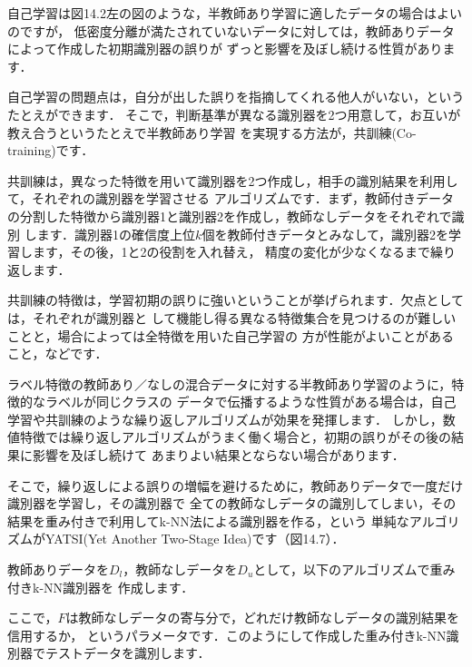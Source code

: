 
自己学習は図14.2左の図のような，半教師あり学習に適したデータの場合はよいのですが，
低密度分離が満たされていないデータに対しては，教師ありデータによって作成した初期識別器の誤りが
ずっと影響を及ぼし続ける性質があります．



自己学習の問題点は，自分が出した誤りを指摘してくれる他人がいない，というたとえができます．
そこで，判断基準が異なる識別器を2つ用意して，お互いが教え合うというたとえで半教師あり学習
を実現する方法が，共訓練(Co-training)です．


共訓練は，異なった特徴を用いて識別器を2つ作成し，相手の識別結果を利用して，それぞれの識別器を学習させる
アルゴリズムです．まず，教師付きデータの分割した特徴から識別器1と識別器2を作成し，教師なしデータをそれぞれで識別
します．識別器1の確信度上位$k$個を教師付きデータとみなして，識別器2を学習します，その後，1と2の役割を入れ替え，
精度の変化が少なくなるまで繰り返します．


共訓練の特徴は，学習初期の誤りに強いということが挙げられます．欠点としては，それぞれが識別器と
して機能し得る異なる特徴集合を見つけるのが難しいことと，場合によっては全特徴を用いた自己学習の
方が性能がよいことがあること，などです．


ラベル特徴の教師あり／なしの混合データに対する半教師あり学習のように，特徴的なラベルが同じクラスの
データで伝播するような性質がある場合は，自己学習や共訓練のような繰り返しアルゴリズムが効果を発揮します．
しかし，数値特徴では繰り返しアルゴリズムがうまく働く場合と，初期の誤りがその後の結果に影響を及ぼし続けて
あまりよい結果とならない場合があります．

そこで，繰り返しによる誤りの増幅を避けるために，教師ありデータで一度だけ識別器を学習し，その識別器で
全ての教師なしデータの識別してしまい，その結果を重み付きで利用してk-NN法による識別器を作る，という
単純なアルゴリズムがYATSI(Yet Another Two-Stage Idea)です（図14.7）．


教師ありデータを$D_l$，教師なしデータを$D_u$として，以下のアルゴリズムで重み付きk-NN識別器を
作成します．


ここで，$F$は教師なしデータの寄与分で，どれだけ教師なしデータの識別結果を信用するか，
というパラメータです．このようにして作成した重み付きk-NN識別器でテストデータを識別します．


